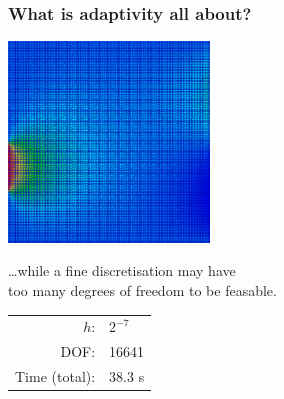 \begin{frame}
  \frametitle<presentation>{What is adaptivity all about?}
  \begin{center}
    \includegraphics[width=0.4\textwidth]{EPS/adaptivity/high_resolution}

    \ldots while a fine discretisation may have \\ too many degrees of freedom to be feasable.

    \begin{tabular}{rl}
      $h$:          & $2^{-7}$ \\
      DOF:          & 16641    \\
      Time (total): & 38.3 s
    \end{tabular}
  \end{center}
\end{frame}

